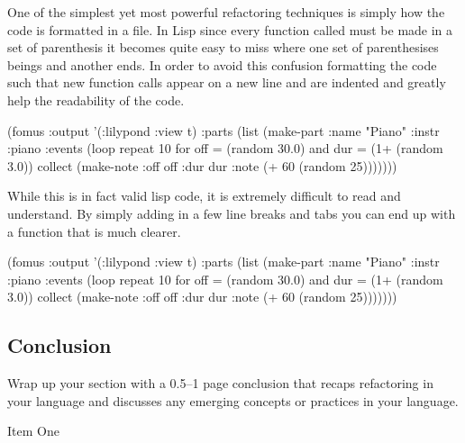 \documentclass{article}
\begin{document}
One of the simplest yet most powerful refactoring techniques is simply how the code is formatted in a file. In Lisp since every function called must be made in a set of parenthesis it becomes quite easy to miss where one set of parenthesises beings and another ends. In order to avoid this confusion formatting the code such that new function calls appear on a new line and are indented and greatly help the readability of the code.

(fomus :output '(:lilypond :view t) :parts (list (make-part :name "Piano" :instr :piano :events (loop repeat 10 for off = (random 30.0) and dur = (1+ (random 3.0)) collect (make-note :off off :dur dur :note (+ 60 (random 25)))))))

While this is in fact valid lisp code, it is extremely difficult to read and understand. By simply adding in a few line breaks and tabs you can end up with a function that is much clearer.

(fomus
 :output '(:lilypond :view t)
 :parts
 (list
  (make-part
   :name "Piano"
   :instr :piano
   :events
   (loop repeat 10
	 for off = (random 30.0)
	 and dur = (1+ (random 3.0))
	 collect (make-note :off off :dur dur :note (+ 60 (random 25)))))))

\subsection*{Conclusion}

Wrap up your section with a 0.5--1 page conclusion that recaps refactoring in your language and discusses any emerging concepts or practices in your language.

\begin{thebibliography}{9}
 Item One
\end{thebibliography}
\end{document}
